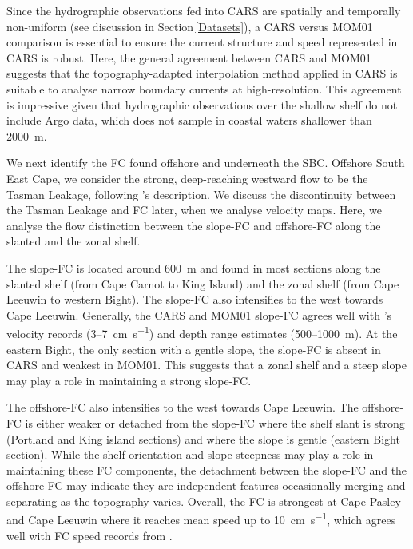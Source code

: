 \documentclass[preprint,3p,review,12pt]{elsarticle}
\newcommand{\citepos}[1]{\citeauthor{#1}'s \citeyearpar{#1}}
\begin{document}
Since the hydrographic observations fed into CARS are spatially and temporally non-uniform (see \citeauthor{Ridgway2002} \citeyear{Ridgway2002} discussion in Section\,\ref{Datasets}), a CARS versus MOM01 comparison is essential to ensure the current structure and speed represented in CARS is robust. Here, the general agreement between CARS and MOM01 suggests that the topography-adapted interpolation method applied in CARS is suitable to analyse narrow boundary currents at high-resolution. This agreement is impressive given that hydrographic observations over the shallow shelf do not include Argo data, which does not sample in coastal waters shallower than \SI{2000}{\meter}. 

We next identify the FC found offshore and underneath the SBC. Offshore South East Cape, we consider the strong, deep-reaching westward flow to be the Tasman Leakage, following \citepos{Speich2002,vanSebille2012,vanSebille2014} description. We discuss the discontinuity between the Tasman Leakage and FC later, when we analyse velocity maps. Here, we analyse the flow distinction between the slope-FC and offshore-FC along the slanted and the zonal shelf.

The slope-FC is located around \SI{600}{\meter} and found in most sections along the slanted shelf (from Cape Carnot to King Island) and the zonal shelf (from Cape Leeuwin to western Bight). The slope-FC also intensifies to the west towards Cape Leeuwin. Generally, the CARS and MOM01 slope-FC agrees well with \citepos{Middleton2007} velocity records (\num{3}--\SI{7}{\centi\meter\per\second}) and depth range estimates (\num{500}--\SI{1000}{\meter}). At the eastern Bight, the only section with a gentle slope, the slope-FC is absent in CARS and weakest in MOM01. This suggests that a zonal shelf and a steep slope may play a role in maintaining a strong slope-FC. 

The offshore-FC also intensifies to the west towards Cape Leeuwin. The offshore-FC is either weaker or detached from the slope-FC where the shelf slant is strong (Portland and King island sections) and where the slope is gentle (eastern Bight section). While the shelf orientation and slope steepness may play a role in maintaining these FC components, the detachment between the slope-FC and the offshore-FC may indicate they are independent features occasionally merging and separating as the topography varies. Overall, the FC is strongest at Cape Pasley and Cape Leeuwin where it reaches mean speed up to \SI{10}{\centi\meter\per\second}, which agrees well with FC speed records from \citet{Cresswell1993}.
\end{document}
